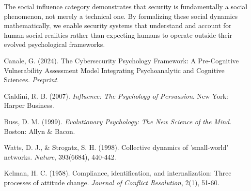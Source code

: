 \documentclass[11pt,a4paper]{article}
\begin{document}
The social influence category demonstrates that security is fundamentally a social phenomenon, not merely a technical one. By formalizing these social dynamics mathematically, we enable security systems that understand and account for human social realities rather than expecting humans to operate outside their evolved psychological frameworks.

\begin{thebibliography}{9}

Canale, G. (2024). The Cybersecurity Psychology Framework: A Pre-Cognitive Vulnerability Assessment Model Integrating Psychoanalytic and Cognitive Sciences. \textit{Preprint}.

Cialdini, R. B. (2007). \textit{Influence: The Psychology of Persuasion}. New York: Harper Business.

Buss, D. M. (1999). \textit{Evolutionary Psychology: The New Science of the Mind}. Boston: Allyn \& Bacon.

Watts, D. J., \& Strogatz, S. H. (1998). Collective dynamics of 'small-world' networks. \textit{Nature}, 393(6684), 440-442.

Kelman, H. C. (1958). Compliance, identification, and internalization: Three processes of attitude change. \textit{Journal of Conflict Resolution}, 2(1), 51-60.

\end{thebibliography}
\end{document}
